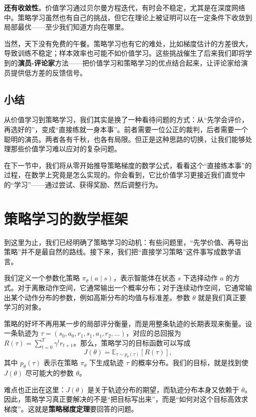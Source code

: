 \documentclass[lang=cn,zihao=-4,a4paper,fontset=windows]{beautybook}
\begin{document}
\textbf{还有收敛性}。价值学习通过贝尔曼方程迭代，有时会不稳定，尤其是在深度网络中。策略学习虽然也有自己的挑战，但它在理论上被证明可以在一定条件下收敛到局部最优——至少我们知道方向在哪里。

当然，天下没有免费的午餐。策略学习也有它的难处，比如梯度估计的方差很大，导致训练不稳定；样本效率也可能不如价值学习。这些挑战催生了后来我们即将学到的\textbf{演员-评论家}方法——把价值学习和策略学习的优点结合起来，让评论家给演员提供低方差的反馈信号。

\subsection{小结}

从价值学习到策略学习，我们其实是换了一种看待问题的方式：从“先学会评价，再选好的”，变成“直接练就一身本事”。前者需要一位公正的裁判，后者需要一个聪明的演员。两者各有千秋，也各有局限。但正是这种思路的切换，让我们能够处理那些价值学习难以应对的复杂问题。

在下一节中，我们将从零开始推导策略梯度的数学公式，看看这个“直接练本事”的过程，在数学上究竟是怎么实现的。你会看到，它比价值学习更接近我们直觉中的“学习”——通过尝试、获得奖励、然后调整行为。

\section{策略学习的数学框架}

到这里为止，我们已经明确了策略学习的动机：有些问题里，“先学价值、再导出策略”并不是最自然的路线。接下来，我们把“直接学习策略”这件事写成数学语言。

我们定义一个参数化策略 \(\pi_\theta(a \mid s)\)，表示智能体在状态 \(s\) 下选择动作 \(a\) 的方式。对于离散动作空间，它通常输出一个概率分布；对于连续动作空间，它通常输出某个动作分布的参数，例如高斯分布的均值与标准差。参数 \(\theta\) 就是我们真正要学习的对象。

策略的好坏不再用某一步的局部评分衡量，而是用整条轨迹的长期表现来衡量。设一条轨迹为 \(\tau = (s_0, a_0, r_1, s_1, a_1, r_2, \dots)\)，对应的总回报为 \(R(\tau) = \sum_{t=0}^T \gamma^t r_{t+1}\)。那么，策略学习的目标函数可以写成
\[
J(\theta) = \mathbb{E}_{\tau \sim p_\theta(\tau)} \left[ R(\tau) \right],
\]
其中 \(p_\theta(\tau)\) 表示在策略 \(\pi_\theta\) 下生成轨迹 \(\tau\) 的概率分布。我们的目标，就是找到使 \(J(\theta)\) 尽可能大的参数 \(\theta\)。

难点也正出在这里：\(J(\theta)\) 是关于轨迹分布的期望，而轨迹分布本身又依赖于 \(\theta\)。因此，策略学习真正要解决的不是“把目标写出来”，而是“如何对这个目标高效求梯度”。这就是\textbf{策略梯度定理}要回答的问题。
\end{document}
